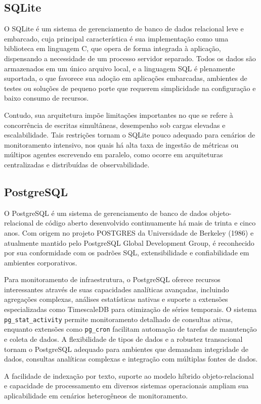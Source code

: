 \subsection{SQLite}
\label{subsection:SQLite}

{\color{red}

O SQLite \citep{sqlite2025} é um sistema de gerenciamento de banco de dados relacional leve e embarcado, cuja principal característica é sua implementação como uma biblioteca em linguagem C, que opera de forma integrada à aplicação, dispensando a necessidade de um processo servidor separado. Todos os dados são armazenados em um único arquivo local, e a linguagem SQL é plenamente suportada, o que favorece sua adoção em aplicações embarcadas, ambientes de testes ou soluções de pequeno porte que requerem simplicidade na configuração e baixo consumo de recursos.

Contudo, sua arquitetura impõe limitações importantes no que se refere à concorrência de escritas simultâneas, desempenho sob cargas elevadas e escalabilidade. Tais restrições tornam o SQLite pouco adequado para cenários de monitoramento intensivo, nos quais há alta taxa de ingestão de métricas ou múltipos agentes escrevendo em paralelo, como ocorre em arquiteturas centralizadas e distribuídas de observabilidade.

}

\subsection{PostgreSQL}
\label{subsection:PostgreSQL}

{\color{red}

O PostgreSQL \citep{postgresql2025} é um sistema de gerenciamento de banco de dados objeto-relacional de código aberto desenvolvido continuamente há mais de trinta e cinco anos. Com origem no projeto POSTGRES da Universidade de Berkeley (1986) e atualmente mantido pelo PostgreSQL Global Development Group, é reconhecido por sua conformidade com os padrões SQL, extensibilidade e confiabilidade em ambientes corporativos.

Para monitoramento de infraestrutura, o PostgreSQL oferece recursos interessantes através de suas capacidades analíticas avançadas, incluindo agregações complexas, análises estatísticas nativas e suporte a extensões especializadas como TimescaleDB \citep{timescaledb2025} para otimização de séries temporais. O sistema \verb|pg_stat_activity| permite monitoramento detalhado de consultas ativas, enquanto extensões como \verb|pg_cron| facilitam automação de tarefas de manutenção e coleta de dados. A flexibilidade de tipos de dados e a robustez transacional tornam o PostgreSQL adequado para ambientes que demandam integridade de dados, consultas analíticas complexas e integração com múltiplas fontes de dados.

A facilidade de indexação por texto, suporte ao modelo híbrido objeto-relacional e capacidade de processamento em diversos sistemas operacionais ampliam sua aplicabilidade em cenários heterogêneos de monitoramento.

}

